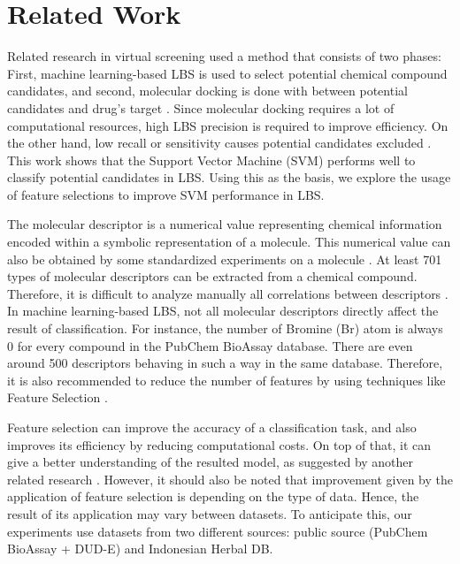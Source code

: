 \documentclass[conference]{IEEEtran}
\begin{document}
\section{Related Work}

Related research in virtual screening used a method that consists of two phases: First, machine learning-based LBS is used to select potential chemical compound candidates, and second, molecular docking is done with between potential candidates and drug's target \cite{hilman2012analisis}. Since molecular docking requires a lot of computational resources, high LBS precision is required to improve efficiency. On the other hand, low recall or sensitivity causes potential candidates excluded \cite{korkmaz2014drug}. This work shows that the Support Vector Machine (SVM) performs well to classify potential candidates in LBS. Using this as the basis, we explore the usage of feature selections to improve SVM performance in LBS.

The molecular descriptor is a numerical value representing chemical information encoded within a symbolic representation of a molecule. This numerical value can also be obtained by some standardized experiments on a molecule \cite{yap2011padel}. At least 701 types of molecular descriptors can be extracted from a chemical compound. Therefore, it is difficult to analyze manually all correlations between descriptors \cite{korkmaz2014drug}. In machine learning-based LBS, not all molecular descriptors directly affect the result of classification. For instance, the number of Bromine (Br) atom is always 0 for every compound in the PubChem BioAssay database. There are even around 500 descriptors behaving in such a way in the same database. Therefore, it is also recommended to reduce the number of features by using techniques like Feature Selection \cite{korkmaz2014drug}.

Feature selection can improve the accuracy of a classification task, and also improves its efficiency by reducing computational costs. On top of that, it can give a better understanding of the resulted model, as suggested by another related research \cite{janecek2008relationship}. However, it should also be noted that improvement given by the application of feature selection is depending on the type of data. Hence, the result of its application may vary between datasets\cite{janecek2008relationship}. To anticipate this, our experiments use datasets from two different sources: public source (PubChem BioAssay + DUD-E) and Indonesian Herbal DB.
\end{document}
